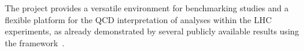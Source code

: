 
The \fitter project provides a versatile environment for benchmarking studies 
and a flexible platform for the QCD interpretation of analyses within the LHC experiments,
as already demonstrated by several publicly available results using the \fitter framework~\cite{atlas:strange,atlas:jets,atlas:hm,cms:strange,cms:jets,h1:2012kk,h1zeus:charm}.  
